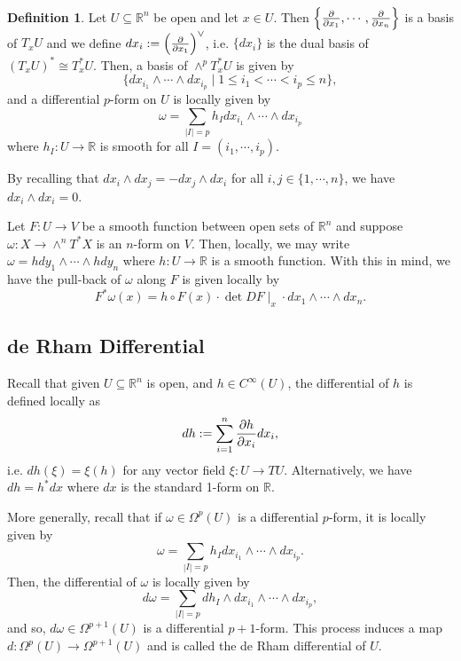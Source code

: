 \documentclass[]{article}
\theoremstyle{definition}
\theoremstyle{definition}
\newtheorem{definition}{Definition}[section]
\begin{document}
\begin{definition}
  Let \(U \subseteq \mathbb{R}^n\) be open and let \(x \in U\). Then 
  \(\left\{\pdv{x_1}, \cdots, \pdv{x_n}\right\}\) is a basis of 
  \(T_x U\) and we define \(dx_i := \left(\pdv{x_1}\right)^\vee\), i.e. 
  \(\{dx_i\}\) is the dual basis of \((T_x U)^* \cong T^*_x U\). Then, 
  a basis of \(\wedge^p T^*_x U\) is given by 
  \[\{dx_{i_1} \wedge \cdots \wedge dx_{i_p} \mid 1 \le i_1 < \cdots < i_p \le n\},\]
  and a differential \(p\)-form on \(U\) is locally given by 
  \[\omega = \sum_{|I| = p} h_I dx_{i_1} \wedge \cdots \wedge dx_{i_p}\]
  where \(h_I : U \to \mathbb{R}\) is smooth for all \(I = (i_1, \cdots, i_p)\).
\end{definition}

By recalling that \(dx_i \wedge dx_j = - dx_j \wedge dx_i\) for all 
\(i, j \in \{1, \cdots, n\}\), we have \(dx_i \wedge dx_i = 0\).

Let \(F : U \to V\) be a smooth function between open sets of \(\mathbb{R}^n\) 
and suppose \(\omega : X \to \wedge^n T^* X\) is an \(n\)-form on \(V\). Then, 
locally, we may write \(\omega = hdy_1 \wedge \cdots \wedge hdy_n\) where 
\(h : U \to \mathbb{R}\) is a smooth function. With this in mind, 
we have the pull-back of \(\omega\) along \(F\) is given locally by 
\begin{equation}\label{pull-back-eq}
  F^* \omega(x) = h \circ F(x) \cdot \det DF\mid_x \cdot dx_1 \wedge \cdots \wedge dx_n.
\end{equation}

\subsection{de Rham Differential}

Recall that given \(U \subseteq \mathbb{R}^n\) is open, and \(h \in C^\infty(U)\), 
the differential of \(h\) is defined locally as 
\[dh := \sum_{i = 1}^n \pdv{h}{x_i} dx_i,\]
i.e. \(dh(\xi) = \xi(h)\) for any vector field \(\xi : U \to TU\).
Alternatively, we have \(dh = h^* dx\) where \(dx\) is the 
standard 1-form on \(\mathbb{R}\).

More generally, recall that if \(\omega \in \Omega^p(U)\) is a 
differential \(p\)-form, it is locally given by 
\[\omega = \sum_{|I| = p} h_I dx_{i_1} \wedge \cdots \wedge dx_{i_p}.\]
Then, the differential of \(\omega\) is locally given by 
\[d\omega = \sum_{|I| = p} dh_I \wedge dx_{i_1} \wedge \cdots \wedge dx_{i_p},\]
and so, \(d\omega \in \Omega^{p + 1}(U)\) is a differential \(p + 1\)-form.
This process induces a map \(d : \Omega^p(U) \to \Omega^{p + 1}(U)\) and 
is called the de Rham differential of \(U\).
\end{document}
